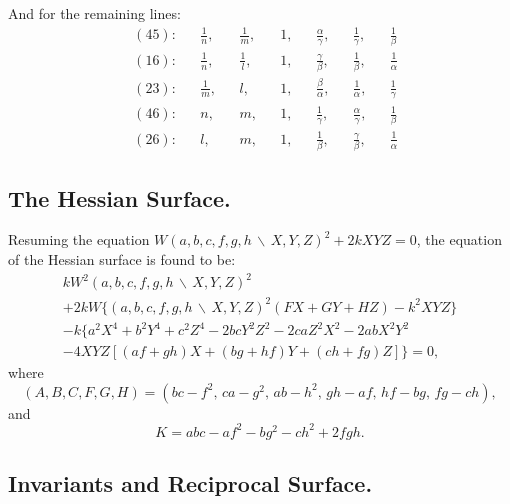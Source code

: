 \documentclass[11pt,a4paper]{article}
\begin{document}
And for the remaining lines:
\begin{align*}
&(45): && \frac{1}{n}, && \frac{1}{m}, && 1, && \frac{\alpha}{\gamma}, && \frac{1}{\gamma}, && \frac{1}{\beta} \\
&(16): && \frac{1}{n}, && \frac{1}{l}, && 1, && \frac{\gamma}{\beta}, && \frac{1}{\beta}, && \frac{1}{\alpha} \\
&(23): && \frac{1}{m}, && l, && 1, && \frac{\beta}{\alpha}, && \frac{1}{\alpha}, && \frac{1}{\gamma} \\
&(46): && n, && m, && 1, && \frac{1}{\gamma}, && \frac{\alpha}{\gamma}, && \frac{1}{\beta} \\
&(26): && l, && m, && 1, && \frac{1}{\beta}, && \frac{\gamma}{\beta}, && \frac{1}{\alpha}
\end{align*}

\subsection*{The Hessian Surface.}

Resuming the equation $W(a,b,c,f,g,h \,\backslash\, X,Y,Z)^2 + 2kXYZ = 0$, the equation of the Hessian surface is found to be:
\begin{multline*}
kW^2(a,b,c,f,g,h \,\backslash\, X,Y,Z)^2 \\
+ 2kW\{(a,b,c,f,g,h \,\backslash\, X,Y,Z)^2(FX + GY + HZ) - k^2 XYZ\} \\
- k\{a^2 X^4 + b^2 Y^4 + c^2 Z^4 - 2bc Y^2 Z^2 - 2ca Z^2 X^2 - 2ab X^2 Y^2 \\
- 4XYZ[(af+gh)X + (bg+hf)Y + (ch+fg)Z]\} = 0,
\end{multline*}
where
\begin{equation*}
(A,B,C,F,G,H) = (bc-f^2,\, ca-g^2,\, ab-h^2,\, gh-af,\, hf-bg,\, fg-ch),
\end{equation*}
and
\begin{equation*}
K = abc - af^2 - bg^2 - ch^2 + 2fgh.
\end{equation*}

\subsection*{Invariants and Reciprocal Surface.}
\end{document}
